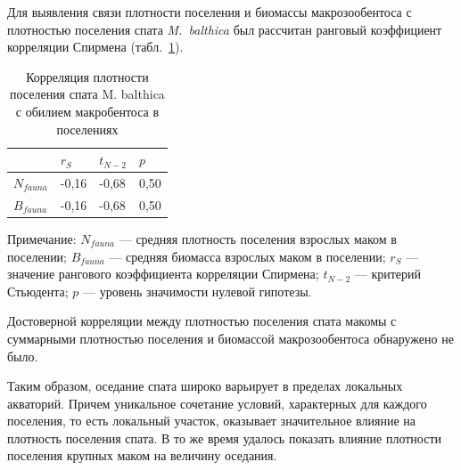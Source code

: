 Для выявления связи плотности поселения и биомассы макрозообентоса с плотностью поселения спата {\it M.~balthica} был рассчитан ранговый коэффициент корреляции Спирмена (табл.~\ref{spat_fauna_correlation}). 
\begin{table}[p]
\caption{Корреляция плотности поселения спата M. balthica с обилием макробентоса в поселениях}
\label{spat_fauna_correlation}
\begin{center}
\begin{tabular}{|l|lll|}
\hline
     & $r_S$    & $t_{N-2}$   & $p$    \\ \hline
$N_{fauna}$  & -0,16 & -0,68 & 0,50 \\
$B_{fauna}$  & -0,16 & -0,68 & 0,50\\
\hline
\end{tabular}
\end{center}

\footnotesize{Примечание: $N_{fauna}$ --- средняя плотность поселения взрослых маком в поселении; 
$B_{fauna}$ --- средняя биомасса взрослых маком в поселении; 
$r_S$ --- значение рангового коэффициента корреляции Спирмена; 
$t_{N-2}$ --- критерий Стьюдента;   
$p$ --- уровень значимости нулевой гипотезы.}
\end{table}
Достоверной корреляции между плотностью поселения спата макомы с суммарными плотностью поселения и биомассой макрозообентоса обнаружено не было.


\bigskip
Таким образом, оседание спата широко варьирует в пределах локальных акваторий.
Причем уникальное сочетание условий, характерных для каждого поселения, то есть локальный участок, оказывает значительное влияние на плотность поселения спата.
В то же время удалось показать влияние плотности поселения крупных маком на величину оседания.


\afterpage{\clearpage}
